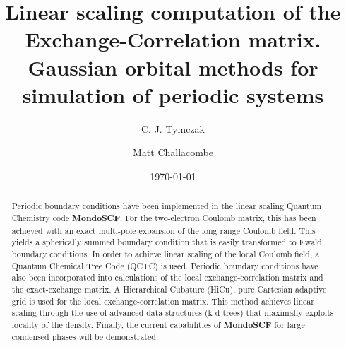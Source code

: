 \documentclass[prb,aps,nobibnotes,twocolumn,doublespace,twocolumngrid,superbib]{revtex4}
\begin{document}
\title{\textbf{Linear scaling computation of the Exchange-Correlation matrix. Gaussian
orbital methods for simulation of periodic systems}}


\author{C. J. Tymczak}
\author{Matt Challacombe}


\date{\today}

\begin{abstract}
Periodic boundary conditions have been implemented in the linear scaling
Quantum Chemistry code \textbf{MondoSCF}. For the two-electron Coulomb
matrix, this has been achieved with an exact multi-pole expansion of
the long range Coulomb field. This yields a spherically summed boundary
condition that is easily transformed to Ewald boundary conditions.
In order to achieve linear scaling of the local Coulomb field, a Quantum
Chemical Tree Code (QCTC) is used. Periodic boundary conditions have
also been incorporated into calculations of the local exchange-correlation
matrix and the exact-exchange matrix. A Hierarchical Cubature (HiCu),
pure Cartesian adaptive grid is used for the local exchange-correlation
matrix. This method achieves linear scaling through the use of advanced
data structures (k-d trees) that maximally exploits locality of the
density. Finally, the current capabilities of \textbf{MondoSCF} for large condensed
phases will be demonstrated.
\end{abstract}

\maketitle
\end{document}
